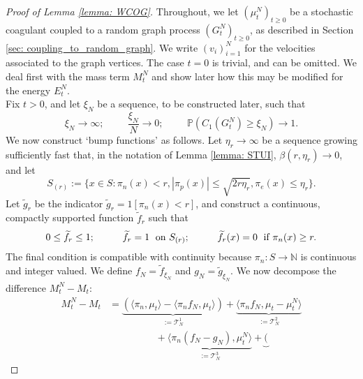 \documentclass[11pt, notitlepage]{article}
\begin{document}
\begin{proof}[Proof of Lemma \ref{lemma: WCOG}]   Throughout, we let $(\mu^N_t)_{t\geq 0}$ be a stochastic coagulant coupled to a random graph process $(G^N_t)_{t\geq 0}$, as described in Section \ref{sec: coupling_to_random_graph}. We write $(v_i)_{i=1}^N$ for the velocities associated to the graph vertices. The case $t=0$ is trivial, and can be omitted. We deal first with the mass term $M^N_t$ and show later how this may be modified for the energy $E^N_t.$ \medskip \\ Fix $t> 0$, and let $\xi_N$ be a sequence, to be constructed later, such that \begin{equation}\label{eq: choice of xiN for WCOG}
       \xi_N\rightarrow \infty; \hspace{1cm} \frac{\xi_N}{N}\rightarrow 0; \hspace{1cm}\mathbb{P}(C_1(G^N_t)\geq \xi_N)\rightarrow 1.
   \end{equation}  We now construct `bump functions' as follows.  Let $\eta_r\rightarrow \infty$ be a sequence growing sufficiently fast that, in the notation of Lemma \ref{lemma: STUI}, $\beta(r, \eta_r)\rightarrow 0$, and let
 \begin{equation}
       S_{(r)} := \{x \in S: \pi_n(x)< r, |\pi_p(x)|\leq \sqrt{2r\eta_r}, \pi_e(x)\leq \eta_r\}.
 \end{equation}
 Let $\widetilde{g}_r$ be the indicator $\widetilde{g}_r=1[\pi_n(x)< r]$, and construct a continuous, compactly supported function $\widetilde{f}_r$ such that
 \begin{equation}
      0\leq \widetilde{f}_r\leq 1;\hspace{1cm} \widetilde{f}_r=1 \hspace{0.1cm} \text{ on } S_{(r)};\hspace{1cm} \widetilde{f}_r(x)=0 \hspace{0.1cm} \text{ if } \pi_n(x)\ge r.
 \end{equation}
 The final condition is compatible with continuity because $\pi_n:S\rightarrow \mathbb{N}$ is continuous and integer valued. We define $f_N=\widetilde{f}_{\xi_N}$ and $g_N=\widetilde{g}_{\xi_N}$.  We now decompose the difference $M^N_t-M_t:$ \begin{equation}\label{eq: decomposition of erorr in WCOG}\begin{split} M^N_t-M_t &= \underbrace{(\langle \pi_n, \mu_t\rangle -\langle \pi_n f_N, \mu_t\rangle)}_{:=\mathcal{T}^1_N} + \underbrace{\langle \pi_n f_N, \mu_t-\mu^N_t\rangle}_{:=\mathcal{T}^2_N} \\[1ex]&\hspace{2cm}+ \underbrace{\langle \pi_n (f_N-g_N), \mu^N_t\rangle}_{:=\mathcal{T}^3_N} +\underbrace{(
}
\end{split}
\end{equation}
\end{proof}
\end{document}
